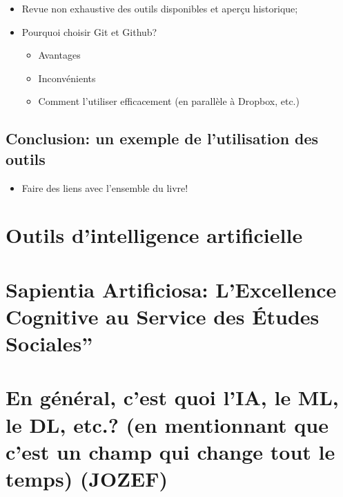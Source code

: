 \documentclass[
  letterpaper,
]{scrbook}
\providecommand{\tightlist}{%
  \setlength{\itemsep}{0pt}\setlength{\parskip}{0pt}}\usepackage{longtable,booktabs,array}
\begin{document}
\begin{itemize}
\tightlist
\item
  Revue non exhaustive des outils disponibles et aperçu historique;
\item
  Pourquoi choisir Git et Github?

  \begin{itemize}
  \tightlist
  \item
    Avantages
  \item
    Inconvénients
  \item
    Comment l'utiliser efficacement (en parallèle à Dropbox, etc.)
  \end{itemize}
\end{itemize}

\hypertarget{conclusion-un-exemple-de-lutilisation-des-outils}{%
\section{Conclusion: un exemple de l'utilisation des
outils}\label{conclusion-un-exemple-de-lutilisation-des-outils}}

\begin{itemize}
\tightlist
\item
  Faire des liens avec l'ensemble du livre!
\end{itemize}


\hypertarget{outils-dintelligence-artificielle}{%
\chapter{Outils d'intelligence
artificielle}\label{outils-dintelligence-artificielle}}


\hypertarget{sapientia-artificiosa-lexcellence-cognitive-au-service-des-uxe9tudes-sociales}{%
\chapter{Sapientia Artificiosa: L'Excellence Cognitive au Service des
Études
Sociales''}\label{sapientia-artificiosa-lexcellence-cognitive-au-service-des-uxe9tudes-sociales}}


\hypertarget{en-guxe9nuxe9ral-cest-quoi-lia-le-ml-le-dl-etc.-en-mentionnant-que-cest-un-champ-qui-change-tout-le-temps-jozef}{%
\chapter{En général, c'est quoi l'IA, le ML, le DL, etc.? (en
mentionnant que c'est un champ qui change tout le temps)
(JOZEF)}\label{en-guxe9nuxe9ral-cest-quoi-lia-le-ml-le-dl-etc.-en-mentionnant-que-cest-un-champ-qui-change-tout-le-temps-jozef}}
\end{document}
